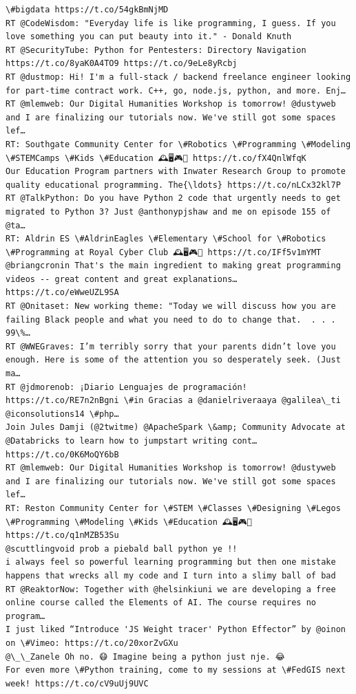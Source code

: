 \documentclass[11pt]{article}
\begin{document}
\begin{Verbatim}[commandchars=\\\{\}]
\#bigdata https://t.co/54gkBmNjMD
RT @CodeWisdom: "Everyday life is like programming, I guess. If you love something you can put beauty into it." - Donald Knuth
RT @SecurityTube: Python for Pentesters: Directory Navigation https://t.co/8yaK0A4TO9 https://t.co/9eLe8yRcbj
RT @dustmop: Hi! I'm a full-stack / backend freelance engineer looking for part-time contract work. C++, go, node.js, python, and more. Enj…
RT @mlemweb: Our Digital Humanities Workshop is tomorrow! @dustyweb and I are finalizing our tutorials now. We've still got some spaces lef…
RT: Southgate Community Center for \#Robotics \#Programming \#Modeling \#STEMCamps \#Kids \#Education 🕰️🖥️🎮💎 https://t.co/fX4QnlWfqK
Our Education Program partners with Inwater Research Group to promote quality educational programming. The{\ldots} https://t.co/nLCx32kl7P
RT @TalkPython: Do you have Python 2 code that urgently needs to get migrated to Python 3? Just @anthonypjshaw and me on episode 155 of @ta…
RT: Aldrin ES \#AldrinEagles \#Elementary \#School for \#Robotics \#Programming at Royal Cyber Club 🕰️🖥️🎮💎 https://t.co/IFf5v1mYMT
@briangcronin That's the main ingredient to making great programming videos -- great content and great explanations… https://t.co/eWweUZL9SA
RT @Onitaset: New working theme: "Today we will discuss how you are failing Black people and what you need to do to change that.  . . . 99\%…
RT @WWEGraves: I’m terribly sorry that your parents didn’t love you enough. Here is some of the attention you so desperately seek. (Just ma…
RT @jdmorenob: ¡Diario Lenguajes de programación! https://t.co/RE7n2nBgni \#in Gracias a @danielriveraaya @galilea\_ti @iconsolutions14 \#php…
Join Jules Damji (@2twitme) @ApacheSpark \&amp; Community Advocate at @Databricks to learn how to jumpstart writing cont… https://t.co/0K6MoQY6bB
RT @mlemweb: Our Digital Humanities Workshop is tomorrow! @dustyweb and I are finalizing our tutorials now. We've still got some spaces lef…
RT: Reston Community Center for \#STEM \#Classes \#Designing \#Legos \#Programming \#Modeling \#Kids \#Education 🕰️🖥️🎮💎 https://t.co/q1nMZB53Su
@scuttlingvoid prob a piebald ball python ye !!
i always feel so powerful learning programming but then one mistake happens that wrecks all my code and I turn into a slimy ball of bad
RT @ReaktorNow: Together with @helsinkiuni we are developing a free online course called the Elements of AI. The course requires no program…
I just liked “Introduce 'JS Weight tracer' Python Effector” by @oinon on \#Vimeo: https://t.co/20xorZvGXu
@\_\_Zanele Oh no. 😷 Imagine being a python just nje. 😂
For even more \#Python training, come to my sessions at \#FedGIS next week! https://t.co/cV9uUj9UVC

\end{Verbatim}
\end{document}
